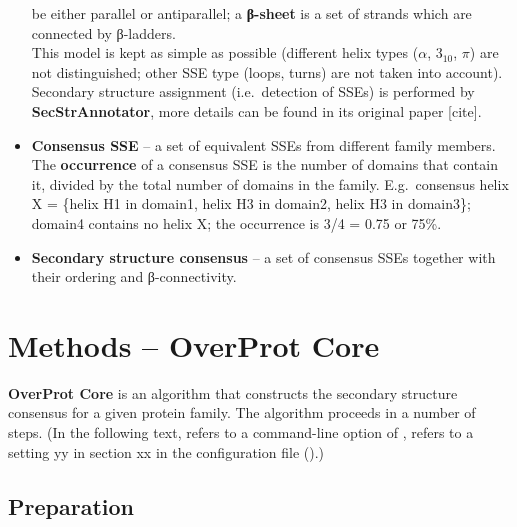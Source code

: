 \documentclass{article}
\begin{document}
\begin{itemize}
    be either parallel or antiparallel; a \textbf{β-sheet} is a set of
    strands which are connected by β-ladders.\\
    This model is kept as simple as possible (different helix types
    (\(\alpha\), \(3_{10}\), \(\pi\)) are not distinguished; other SSE
    type (loops, turns) are not taken into account). Secondary structure
    assignment (i.e.~detection of SSEs) is performed by
    \textbf{SecStrAnnotator}, more details can be found in its original
    paper {[}cite{]}.
  \item
    \textbf{Consensus SSE} -- a set of equivalent SSEs from different
    family members. The \textbf{occurrence} of a consensus SSE is the
    number of domains that contain it, divided by the total number of
    domains in the family. E.g.~consensus helix X = \{helix H1 in
    domain1, helix H3 in domain2, helix H3 in domain3\}; domain4 contains
    no helix X; the occurrence is 3/4 = 0.75 or 75\%.
  \item
    \textbf{Secondary structure consensus} -- a set of consensus SSEs
    together with their ordering and β-connectivity.
\end{itemize}

    


\section{Methods -- OverProt Core}

\textbf{OverProt Core} is an algorithm that constructs the secondary
structure consensus for a given protein family. The algorithm proceeds
in a number of steps. 
(In the following text,  refers to a command-line option of ,
 refers to a setting yy in section xx in the configuration file ().)



\subsection{Preparation}
\end{document}
